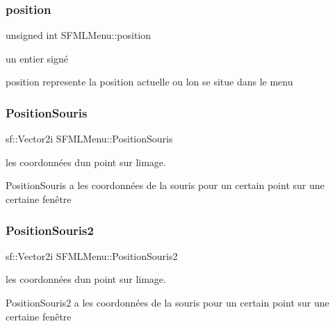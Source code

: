 \subsubsection{\texorpdfstring{position}{position}}
{\footnotesize\ttfamily unsigned int S\+F\+M\+L\+Menu\+::position\hspace{0.3cm}{\ttfamily [private]}}



un entier signé 

position represente la position actuelle ou l\textquotesingle{}on se situe dans le menu \mbox{\label{class_s_f_m_l_menu_aff7f7fece811904e034c1420c61f097d}} 
\subsubsection{\texorpdfstring{Position\+Souris}{PositionSouris}}
{\footnotesize\ttfamily sf\+::\+Vector2i S\+F\+M\+L\+Menu\+::\+Position\+Souris\hspace{0.3cm}{\ttfamily [private]}}



les coordonnées d\textquotesingle{}un point sur l\textquotesingle{}image. 

Position\+Souris a les coordonnées de la souris pour un certain point sur une certaine fenêtre \mbox{\label{class_s_f_m_l_menu_a0accf7d98ec8ed6f09ddded054550bd6}} 
\subsubsection{\texorpdfstring{Position\+Souris2}{PositionSouris2}}
{\footnotesize\ttfamily sf\+::\+Vector2i S\+F\+M\+L\+Menu\+::\+Position\+Souris2\hspace{0.3cm}{\ttfamily [private]}}



les coordonnées d\textquotesingle{}un point sur l\textquotesingle{}image. 

Position\+Souris2 a les coordonnées de la souris pour un certain point sur une certaine fenêtre \mbox{\label{class_s_f_m_l_menu_a9107e0e47b55d7f0d9eb448c23f4ec9e}} 
